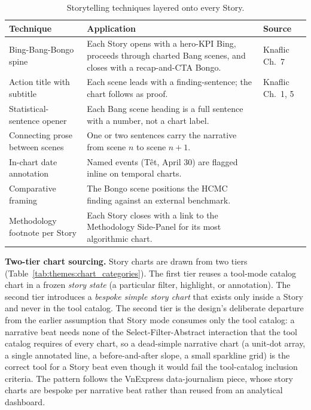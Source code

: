 \begin{table}[!htbp]
\centering
\caption{Storytelling techniques layered onto every Story.}
\label{tab:themes:techniques}
\footnotesize
\renewcommand{\arraystretch}{1.25}
\begin{tabularx}{\linewidth}{p{3.8cm}Xp{2.4cm}}
\hline
\textbf{Technique} & \textbf{Application} & \textbf{Source} \\
\hline
Bing-Bang-Bongo spine         & Each Story opens with a hero-KPI Bing, proceeds through charted Bang scenes, and closes with a recap-and-CTA Bongo. & Knaflic Ch.~7~\cite{knaflic2015} \\
Action title with subtitle    & Each scene leads with a finding-sentence; the chart follows as proof. & Knaflic Ch.~1, 5~\cite{knaflic2015} \\
Statistical-sentence opener   & Each Bang scene heading is a full sentence with a number, not a chart label. & \cite{vnexpress2025labour} \\
Connecting prose between scenes & One or two sentences carry the narrative from scene $n$ to scene $n+1$. & \cite{vnexpress2025labour} \\
In-chart date annotation      & Named events (T\^et, April 30) are flagged inline on temporal charts. & \cite{vnexpress2025labour} \\
Comparative framing           & The Bongo scene positions the HCMC finding against an external benchmark. & \cite{vnexpress2025labour} \\
Methodology footnote per Story & Each Story closes with a link to the Methodology Side-Panel for its most algorithmic chart. & \cite{vnexpress2025labour,linzeng2014} \\
\hline
\end{tabularx}
\end{table}

\noindent\textbf{Two-tier chart sourcing.} Story charts are drawn from two tiers
(Table~\ref{tab:themes:chart_categories}). The first tier reuses a
tool-mode catalog chart in a frozen \emph{story state} (a particular
filter, highlight, or annotation). The second tier introduces a
\emph{bespoke simple story chart} that exists only inside a Story and
never in the tool catalog. The second tier is the design's
deliberate departure from the earlier assumption that Story mode
consumes only the tool catalog: a narrative beat needs none of the
Select-Filter-Abstract interaction that the tool catalog requires of
every chart, so a dead-simple narrative chart (a unit-dot array, a
single annotated line, a before-and-after slope, a small sparkline
grid) is the correct tool for a Story beat even though it would fail
the tool-catalog inclusion criteria. The pattern follows the
VnExpress data-journalism piece, whose story charts are bespoke per
narrative beat rather than reused from an analytical dashboard.

